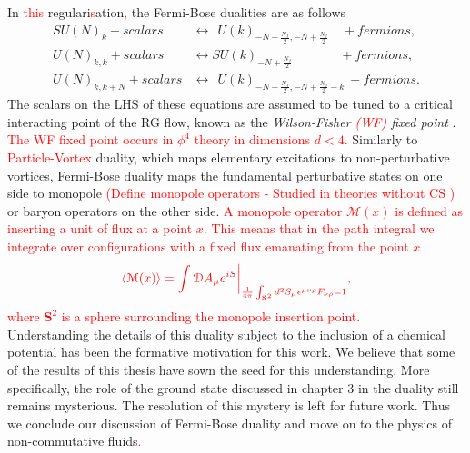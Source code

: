         \indent In \textcolor{red}{this} regulari\textcolor{red}{s}ation\textcolor{red}{,} the Fermi-Bose dualities are as follows \cite{Aharony:2015mjs} 
            \begin{align}
                SU(N)_k + scalars &\longleftrightarrow \ \ U(k)_{-N +\frac{N_f}{2}, -N + \frac{N_f}{2}} \quad + fermions, \label{eq:Fermi-Bose_1} \\
                U(N)_{k,k} + scalars &\longleftrightarrow SU(k)_{-N +\frac{N_f}{2}}\qquad \ \ \ \quad+ fermions,  \label{eq:Fermi-Bose_2}\\
                U(N)_{k,k+N} + scalars &\longleftrightarrow \ \ U(k)_{-N +\frac{N_f}{2}, -N + \frac{N_f}{2}-k} \ + fermions.  \label{eq:Fermi-Bose_3}
            \end{align}
            The scalars on the LHS of these equations are assumed to be tuned to a critical interacting point of the RG flow, known as the \textit{Wilson-Fisher \textcolor{red}{(WF)} fixed point} \cite{Wilson:1971dc}. \textcolor{red}{The WF fixed point occurs in $\phi^4$ theory in dimensions $d<4$.} Similarly to \textcolor{red}{Particle-Vortex} duality, which maps elementary excitations to non-perturbative vortices, Fermi-Bose duality maps the fundamental perturbative states on one side to monopole \textcolor{red}{(Define monopole operators - Studied in theories without CS \cite{Borokhov:2002ib, Borokhov:2002cg, Pufu:2013eda, Pufu:2013vpa})}  or baryon operators on the other side. \textcolor{red}{A monopole operator $\mathcal{M}(x)$ is defined as inserting a unit of flux at a point $x$. This means that in the path integral we integrate over configurations with a fixed flux emanating from the point $x$} \\
\begin{align}
    \textcolor{red}{ \langle \mathcal{M}(x) \rangle = \int \mathcal{D}A_{\mu} e^{i S}\bigg |_{\frac{1}{4\pi} \int_{\textbf{S}^2} d^2S_{\mu} \epsilon^{\mu \nu \rho}F_{\nu \rho} =1}, }
\end{align}
    \textcolor{red}{where $\mathbf{S}^2$ is a sphere surrounding the monopole insertion point.} \\
            \indent Understanding the details of this duality subject to the inclusion of a chemical potential has been the formative motivation for this work. We believe that some of the results of this thesis have sown the seed for this understanding. More specifically, the role of the ground state discussed in chapter 3 in the duality still remains mysterious. The resolution of this mystery is left for future work. Thus we conclude our discussion of Fermi-Bose duality and move on to the physics of non-commutative fluids\textcolor{red}{.}
%
